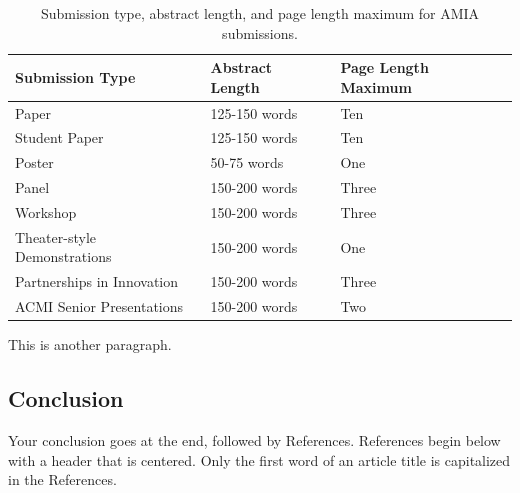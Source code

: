 \documentclass{amia}
\begin{document}
\begin{table}[H]
\begin{center}
\begin{tabular}{|l|l|l|}
\hline
Submission Type	            &Abstract Length	&Page Length Maximum \\
\hline
Paper                       &125-150 words	    &Ten                 \\
\hline 
Student Paper	            &125-150 words	    &Ten                 \\
\hline
Poster                      &50-75 words        &One                 \\
\hline
Panel	                    &150-200 words      &Three               \\
\hline
Workshop	                &150-200 words      &Three               \\
\hline
Theater-style Demonstrations&150-200 words	    &One                 \\
\hline
Partnerships in Innovation	&150-200 words	    &Three               \\
\hline
ACMI Senior Presentations	&150-200 words	    &Two                 \\
\hline
\end{tabular}
\end{center}
\caption{Submission type, abstract length, and page length maximum for AMIA submissions.}
\label{tab:submission}
\end{table}

This is another paragraph.

\subsection*{Conclusion}

Your conclusion goes at the end, followed by References.  References begin below with a header that is centered.  Only the first word of an article title is capitalized in the References.


\makeatletter
\renewcommand{\@biblabel}[1]{\hfill #1.}
\makeatother


  
\end{document}
